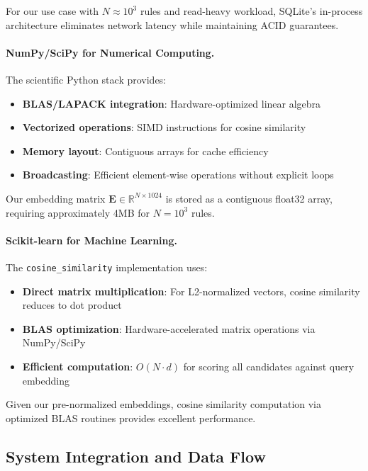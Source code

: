 For our use case with $N \approx 10^3$ rules and read-heavy workload, SQLite's in-process architecture eliminates network latency while maintaining ACID guarantees.

\paragraph{NumPy/SciPy for Numerical Computing.} The scientific Python stack provides:
\begin{itemize}[leftmargin=*,itemsep=2pt,topsep=2pt]
 \item \textbf{BLAS/LAPACK integration}: Hardware-optimized linear algebra \cite{blackford2002updated}
 \item \textbf{Vectorized operations}: SIMD instructions for cosine similarity
 \item \textbf{Memory layout}: Contiguous arrays for cache efficiency
 \item \textbf{Broadcasting}: Efficient element-wise operations without explicit loops
\end{itemize}

Our embedding matrix $\mathbf{E} \in \mathbb{R}^{N \times 1024}$ is stored as a contiguous float32 array, requiring approximately 4MB for $N = 10^3$ rules.

\paragraph{Scikit-learn for Machine Learning.} The \texttt{cosine\_similarity} implementation \cite{pedregosa2011scikit} uses:
\begin{itemize}[leftmargin=*,itemsep=2pt,topsep=2pt]
 \item \textbf{Direct matrix multiplication}: For L2-normalized vectors, cosine similarity reduces to dot product
 \item \textbf{BLAS optimization}: Hardware-accelerated matrix operations via NumPy/SciPy
 \item \textbf{Efficient computation}: $O(N \cdot d)$ for scoring all candidates against query embedding
\end{itemize}
Given our pre-normalized embeddings, cosine similarity computation via optimized BLAS routines provides excellent performance.

\subsection{System Integration and Data Flow}

